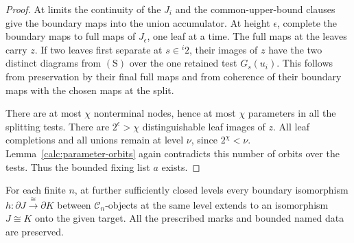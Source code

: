 \begin{proof}
At limits the continuity of the $J_i$ and the
common-upper-bound clauses give the boundary maps into
the union accumulator. At height $\epsilon$, complete
the boundary maps to full maps of $J_\epsilon$, one
leaf at a time. The full maps at the leaves carry $z$.
If two leaves first separate at $s\in{}^i2$, their
images of $z$ have the two distinct diagrams from
$(\mathrm S)$ over the one retained test $G_s(u_i)$.
This follows from preservation by their final full maps
and from coherence of their boundary maps with the
chosen maps at the split.

There are at most $\chi$ nonterminal nodes, hence at
most $\chi$ parameters in all the splitting tests.
There are $2^\epsilon>\chi$ distinguishable leaf
images of $z$. All leaf completions and all unions
remain at level $\nu$, since $2^\chi<\nu$.
Lemma~\ref{calc:parameter-orbits} again contradicts
this number of orbits over the tests. Thus the bounded
fixing list $a$ exists.
\end{proof}

\begin{theorem}
\label{iter:exact-boundary}
For each finite $n$, at further sufficiently closed
levels every boundary isomorphism
$h:\partial J\overset{\cong}{\longrightarrow}\partial K$
between $\mathcal C_n$-objects at the same level
extends to an isomorphism $J\cong K$ onto the given
target. All the prescribed marks and bounded named
data are preserved.
\end{theorem}

